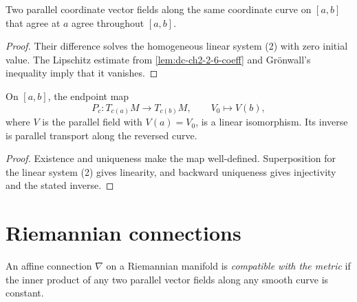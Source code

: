 \begin{lemma}
  \label{lem:dc-ch2-2-6-unique}


  Two parallel coordinate vector fields along the same coordinate curve on
  $[a,b]$ that agree at $a$ agree throughout $[a,b]$.
\end{lemma}
\begin{proof}
  \sketch
  Their difference solves the homogeneous linear system (2) with zero initial
  value. The Lipschitz estimate from \cref{lem:dc-ch2-2-6-coeff} and
  Grönwall's inequality imply that it vanishes.
\end{proof}

\begin{lemma}
  \label{lem:dc-ch2-2-6-transport}


  On $[a,b]$, the endpoint map
  \[
    P_c\colon T_{c(a)}M\longrightarrow T_{c(b)}M,
    \qquad V_0\longmapsto V(b),
  \]
  where $V$ is the parallel field with $V(a)=V_0$, is a linear isomorphism.
  Its inverse is parallel transport along the reversed curve.
\end{lemma}
\begin{proof}
  \sketch
  Existence and uniqueness make the map well-defined. Superposition for the
  linear system (2) gives linearity, and backward uniqueness gives injectivity
  and the stated inverse.
\end{proof}

\section{Riemannian connections}

\begin{definition}
  \label{def:dc-ch2-3-1}


  An affine connection $\nabla$ on a Riemannian manifold is \emph{compatible
  with the metric} if the inner product of any two parallel vector fields along
  any smooth curve is constant.
\end{definition}

